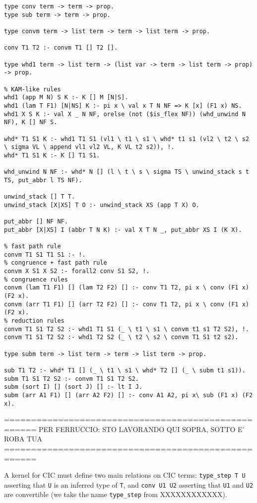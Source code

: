 \begin{verbatim}
type conv term -> term -> prop.
type sub term -> term -> prop.

type convm term -> list term -> term -> list term -> prop.

conv T1 T2 :- convm T1 [] T2 [].

type whd1 term -> list term -> (list var -> term -> list term -> prop) -> prop.

% KAM-like rules
whd1 (app M N) S K :- K [] M [N|S].
whd1 (lam T F1) [N|NS] K :- pi x \ val x T N NF => K [x] (F1 x) NS.
whd1 X S K :- val X _ N NF, orelse (not ($is_flex NF)) (whd_unwind N NF), K [] NF S.

whd* T1 S1 K :- whd1 T1 S1 (vl1 \ t1 \ s1 \ whd* t1 s1 (vl2 \ t2 \ s2 \ sigma VL \ append vl1 vl2 VL, K VL t2 s2)), !.
whd* T1 S1 K :- K [] T1 S1.

whd_unwind N NF :- whd* N [] (l \ t \ s \ sigma TS \ unwind_stack s t TS, put_abbr l TS NF).

unwind_stack [] T T.
unwind_stack [X|XS] T O :- unwind_stack XS (app T X) O.

put_abbr [] NF NF.
put_abbr [X|XS] I (abbr T N K) :- val X T N _, put_abbr XS I (K X).

% fast path rule
convm T1 S1 T1 S1 :- !.
% congruence + fast path rule
convm X S1 X S2 :- forall2 conv S1 S2, !.
% congruence rules
convm (lam T1 F1) [] (lam T2 F2) [] :- conv T1 T2, pi x \ conv (F1 x) (F2 x).
convm (arr T1 F1) [] (arr T2 F2) [] :- conv T1 T2, pi x \ conv (F1 x) (F2 x).
% reduction rules
convm T1 S1 T2 S2 :- whd1 T1 S1 (_ \ t1 \ s1 \ convm t1 s1 T2 S2), !.
convm T1 S1 T2 S2 :- whd1 T2 S2 (_ \ t2 \ s2 \ convm T1 S1 t2 s2).

type subm term -> list term -> term -> list term -> prop.

sub T1 T2 :- whd* T1 [] (_ \ t1 \ s1 \ whd* T2 [] (_ \ subm t1 s1)).
subm T1 S1 T2 S2 :- convm T1 S1 T2 S2.
subm (sort I) [] (sort J) [] :- lt I J.
subm (arr A1 F1) [] (arr A2 F2) [] :- conv A1 A2, pi x\ sub (F1 x) (F2 x).
\end{verbatim}


====================================================
PER FERRUCCIO: STO LAVORANDO QUI SOPRA, SOTTO E' ROBA TUA
====================================================

A kernel for CIC must define two main relations on CIC terms:
\verb+type_step T U+
asserting that \verb+U+ is an inferred type of \verb+T+,
and \verb+conv U1 U2+ 
asserting that \verb+U1+ and \verb+U2+ are convertible
(we take the name \verb+type_step+ from XXXXXXXXXXXX).

